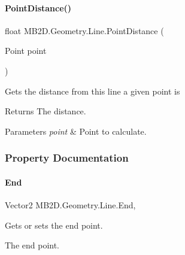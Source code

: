 \paragraph{\texorpdfstring{Point\+Distance()}{PointDistance()}\hspace{0.1cm}{\footnotesize\ttfamily [2/2]}}
{\footnotesize\ttfamily float M\+B2\+D.\+Geometry.\+Line.\+Point\+Distance (\begin{DoxyParamCaption}\item[{Point}]{point }\end{DoxyParamCaption})\hspace{0.3cm}{\ttfamily [inline]}}



Gets the distance from this line a given point is 

\begin{DoxyReturn}{Returns}
The distance.
\end{DoxyReturn}

\begin{DoxyParams}{Parameters}
{\em point} & Point to calculate.\\
\hline
\end{DoxyParams}


\subsubsection{Property Documentation}
\hypertarget{class_m_b2_d_1_1_geometry_1_1_line_a17eb89f60f0bb666884655d4efd18be5}{}\label{class_m_b2_d_1_1_geometry_1_1_line_a17eb89f60f0bb666884655d4efd18be5} 
\paragraph{\texorpdfstring{End}{End}}
{\footnotesize\ttfamily Vector2 M\+B2\+D.\+Geometry.\+Line.\+End\hspace{0.3cm}{\ttfamily [get]}, {\ttfamily [set]}}



Gets or sets the end point. 

The end point.\hypertarget{class_m_b2_d_1_1_geometry_1_1_line_aa02111d13427d3b169c73bb354f7bb53}{}\label{class_m_b2_d_1_1_geometry_1_1_line_aa02111d13427d3b169c73bb354f7bb53} 
